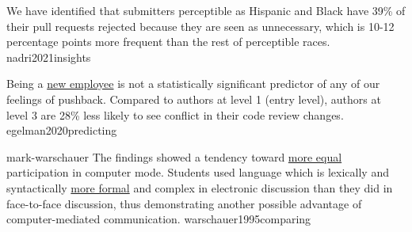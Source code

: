 \documentclass{article}
\begin{document}
  {We have identified that submitters perceptible as Hispanic and Black have 39\% of their pull requests rejected because they are seen as unnecessary, which is 10-12 percentage points more frequent than the rest of perceptible races.}
  {nadri2021insights}

  {Being a \ul{new employee} is not a statistically significant predictor of any of our feelings of pushback. Compared to authors at level 1 (entry level), authors at level 3 are 28\% less likely to see conflict in their code review changes.}
  {egelman2020predicting}



\qte
  {mark-warschauer}
  {The findings showed a tendency toward \ul{more equal} participation in computer mode. Students used language which is lexically and syntactically \ul{more formal} and complex in electronic discussion than they did in face-to-face discussion, thus demonstrating another possible advantage of computer-mediated communication.}
  {warschauer1995comparing}

\end{document}
